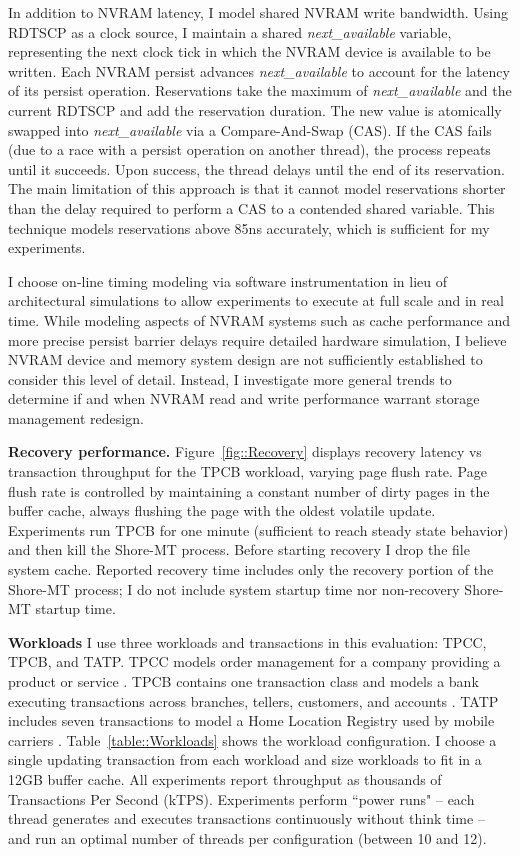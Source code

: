 In addition to NVRAM latency, I model shared NVRAM write bandwidth.
Using RDTSCP as a clock source, I maintain a shared \emph{next\_available} variable, representing the next clock tick in which the NVRAM device is available to be written.
Each NVRAM persist advances \emph{next\_available} to account for the latency of its persist operation.
Reservations take the maximum of \emph{next\_available} and the current RDTSCP and add the reservation duration.
The new value is atomically swapped into \emph{next\_available} via a Compare-And-Swap (CAS).
If the CAS fails (due to a race with a persist operation on another thread), the process repeats until it succeeds.
Upon success, the thread delays until the end of its reservation.
The main limitation of this approach is that it cannot model reservations shorter than the delay required to perform a CAS to a contended shared variable.
This technique models reservations above 85ns accurately, which is sufficient for my experiments.

I choose on-line timing modeling via software instrumentation in lieu of architectural simulations to allow experiments to execute at full scale and in real time.
While modeling aspects of NVRAM systems such as cache performance and more precise persist barrier delays require detailed hardware simulation, I believe NVRAM device and memory system design are not sufficiently established to consider this level of detail.
Instead, I investigate more general trends to determine if and when NVRAM read and write performance warrant storage management redesign.

\textbf{Recovery performance.} Figure~\ref{fig::Recovery} displays recovery latency vs transaction throughput for the TPCB workload, varying page flush rate.
Page flush rate is controlled by maintaining a constant number of dirty pages in the buffer cache, always flushing the page with the oldest volatile update.
Experiments run TPCB for one minute (sufficient to reach steady state behavior) and then kill the Shore-MT process.
Before starting recovery I drop the file system cache.
Reported recovery time includes only the recovery portion of the Shore-MT process; I do not include system startup time nor non-recovery Shore-MT startup time.

\textbf{Workloads}
I use three workloads and transactions in this evaluation: TPCC, TPCB, and TATP.
TPCC models order management for a company providing a product or service \cite{TPCC}.
TPCB contains one transaction class and models a bank executing transactions across branches, tellers, customers, and accounts \cite{TPCB}.
TATP includes seven transactions to model a Home Location Registry used by mobile carriers \cite{TATP}.
Table~\ref{table::Workloads} shows the workload configuration.
I choose a single updating transaction from each workload and size workloads to fit in a 12GB buffer cache.
All experiments report throughput as thousands of Transactions Per Second (kTPS).
Experiments perform ``power runs" -- each thread generates and executes transactions continuously without think time -- and run an optimal number of threads per configuration (between 10 and 12).

